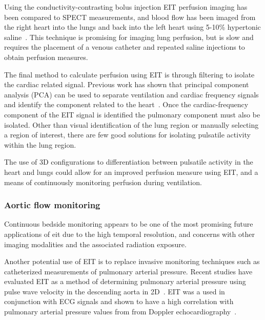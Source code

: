 Using the conductivity-contrasting bolus injection EIT perfusion imaging has been compared to 
SPECT measurements, and blood flow has been imaged from the right heart into the lungs and back into the left heart
using 5-10\% hypertonic saline~\parencite{Frerichs2002,Borges2012}. This technique is promising 
for imaging lung perfusion, but is slow and requires the placement of a venous catheter 
and repeated saline injections to obtain perfusion measures. 

The final method to calculate perfusion using EIT is through filtering to isolate the 
cardiac related signal. Previous work has shown that principal component analysis (PCA) 
can be used to separate ventilation and cardiac frequency signals and identify the component 
related to the heart~\parencite{Deibele2008}. Once the cardiac-frequency component of the 
EIT signal is identified the pulmonary component must also be isolated. Other than visual 
identification of the lung region or manually selecting a region of interest,
there are few good solutions for isolating pulsatile activity within the lung region.

The use of 3D configurations to differentiation between pulsatile activity 
in the heart and lungs could allow for an improved perfusion measure 
using EIT, and a means of continuously monitoring perfusion during ventilation.

\subsubsection{Aortic flow monitoring}

Continuous bedside monitoring appears to be one of the most
promising future applications of \acrshort{eit} due to the high 
temporal resolution, and concerns with other imaging modalities 
and the associated radiation 
exposure. 


Another potential use of EIT is to replace invasive monitoring techniques
such as catheterized measurements of pulmonary arterial pressure.
Recent studies have evaluated EIT as a method of determining 
pulmonary arterial pressure using pulse wave velocity in the 
descending aorta in 2D~\parencite{Braun2018a,Proenca2017,Proenca2016}.
EIT was a used in conjunction with ECG signals and shown to have a high correlation
with pulmonary arterial pressure values from from Doppler echocardiography~\parencite{Proenca2016}.

